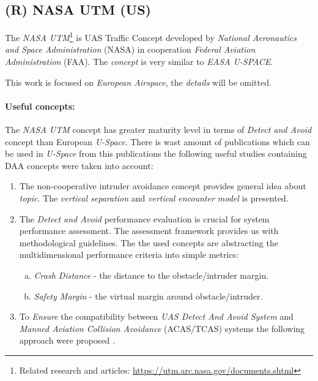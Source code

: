 \subsection{(R) NASA UTM (US)}\label{sec:NASAUtm}

\noindent The \emph{NASA UTM}\footnote{Related research and articles: \url{https://utm.arc.nasa.gov/documents.shtml}} is UAS Traffic Concept developed by \emph{National Aeronautics and Space Administration} (NASA) in cooperation \emph{Federal Aviation Administration} (FAA). The \emph{concept} is very similar to \emph{EASA U-SPACE}.

\begin{note}
    This work is focused on \emph{European Airspace}, the \emph{details} will be omitted. 
\end{note}

\paragraph{Useful concepts:} The \emph{NASA UTM} concept has greater maturity level in terms of \emph{Detect and Avoid} concept than European \emph{U-Space}. There is wast amount of publications which can be used in \emph{U-Space} from this publications the following useful studies containing DAA concepts were taken into account:

\begin{enumerate}    
    \item The non-cooperative intruder avoidance concept \cite{cone2017uas} provides general idea about \emph{topic}. The \emph{vertical separation} and \emph{vertical encounter model} is presented.
    
    \item The \emph{Detect and Avoid} performance evaluation is crucial for system performance assessment. The assessment framework \cite{lee2016wide} provides us with methodological guidelines. The the used concepts are abstracting the multidimensional performance criteria into simple metrics:
    
    \begin{enumerate}[a.]
        \item \emph{Crash Distance} - the distance to the obstacle/intruder margin.
        
        \item \emph{Safety Margin} - the virtual margin around obstacle/intruder.
    \end{enumerate}
    
    \item To \emph{Ensure} the compatibility between \emph{UAS Detect And Avoid System} and \emph{Manned Aviation Collision Avoidance} (ACAS/TCAS) systems the following approach were proposed \cite{thipphavong2017ensuring}.
\end{enumerate}
